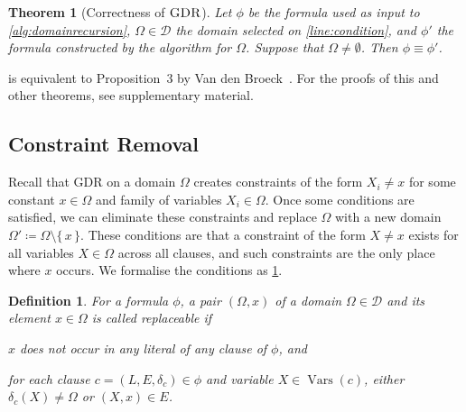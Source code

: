 \documentclass{article}
\newtheorem{theorem}{Theorem}
\newtheorem{definition}{Definition}
\DeclareMathOperator{\GDR}{\textsc{GDR}}
\DeclareMathOperator{\Vars}{Vars}
\begin{document}
\begin{theorem}[Correctness of $\GDR$]\label{thm:correctness1}
  Let $\phi$ be the formula used as input to \cref{alg:domainrecursion},
  $\Omega \in \mathcal{D}$ the domain selected on \cref{line:condition}, and
  $\phi'$ the formula constructed by the algorithm for $\Omega$. Suppose that
  $\Omega \ne \emptyset$. Then $\phi \equiv \phi'$.
\end{theorem}

 is equivalent to Proposition~3 by Van den
Broeck~. For the proofs of this and other
theorems, see supplementary material.

\subsection{Constraint Removal}\label{sec:cr}

Recall that GDR on a domain $\Omega$ creates constraints of the form $X_i \ne x$
for some constant $x \in \Omega$ and family of variables $X_i \in \Omega$. Once
some conditions are satisfied, we can eliminate these constraints and replace
$\Omega$ with a new domain $\Omega' \coloneqq \Omega \setminus \{\, x \,\}$.
These conditions are that a constraint of the form $X \ne x$ exists for all
variables $X \in \Omega$ across all clauses, and such constraints are the only
place where $x$ occurs. We formalise the conditions as \cref{def:replaceable}.

\begin{definition}\label{def:replaceable}
  For a formula $\phi$, a pair $(\Omega, x)$ of a domain
  $\Omega \in \mathcal{D}$ and its element $x \in \Omega$ is called
  \emph{replaceable} if
  \begin{enumerate*}[label=(\roman*)]
    \item $x$ does not occur in any literal of any clause of $\phi$, and
    \item for each clause $c = (L, E, \delta_c) \in \phi$ and variable
    $X \in \Vars(c)$, either $\delta_c(X) \ne \Omega$ or $(X, x) \in E$.
  \end{enumerate*}
\end{definition}
\end{document}
